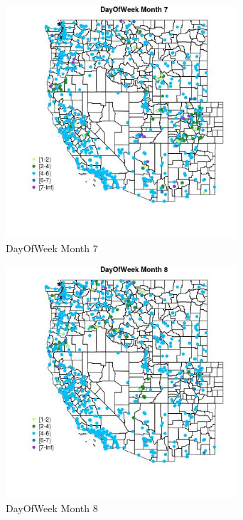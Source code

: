 \begin{figure} 
\centering  
\includegraphics[width=0.77\textwidth]{Code_Outputs/Report_ML_input_PM25_Step4_part_e_de_duplicated_aveswNAs_MapObsMo7DayOfWeek.jpg} 
\caption{\label{fig:Report_ML_input_PM25_Step4_part_e_de_duplicated_aveswNAsMapObsMo7DayOfWeek}DayOfWeek Month 7} 
\end{figure} 
 

\begin{figure} 
\centering  
\includegraphics[width=0.77\textwidth]{Code_Outputs/Report_ML_input_PM25_Step4_part_e_de_duplicated_aveswNAs_MapObsMo8DayOfWeek.jpg} 
\caption{\label{fig:Report_ML_input_PM25_Step4_part_e_de_duplicated_aveswNAsMapObsMo8DayOfWeek}DayOfWeek Month 8} 
\end{figure} 
 

